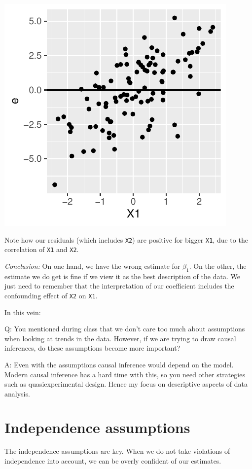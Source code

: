 \documentclass[
  letterpaper,
  DIV=11,
  numbers=noendperiod]{scrreprt}
\begin{document}
\includegraphics{reg_assumptions_files/figure-pdf/unnamed-chunk-4-1.pdf}

Note how our residuals (which includes \texttt{X2}) are positive for
bigger \texttt{X1}, due to the correlation of \texttt{X1} and
\texttt{X2}.

\emph{Conclusion:} On one hand, we have the wrong estimate for
\(\beta_1\). On the other, the estimate we do get is fine if we view it
as the best description of the data. We just need to remember that the
interpretation of our coefficient includes the confounding effect of
\texttt{X2} on \texttt{X1}.

In this vein:

Q: You mentioned during class that we don't care too much about
assumptions when looking at trends in the data. However, if we are
trying to draw causal inferences, do these assumptions become more
important?

A: Even with the assumptions causal inference would depend on the model.
Modern causal inference has a hard time with this, so you need other
strategies such as quasiexperimental design. Hence my focus on
descriptive aspects of data analysis.

\section{Independence assumptions}\label{independence-assumptions}

The independence assumptions are key. When we do not take violations of
independence into account, we can be overly confident of our estimates.
\end{document}
